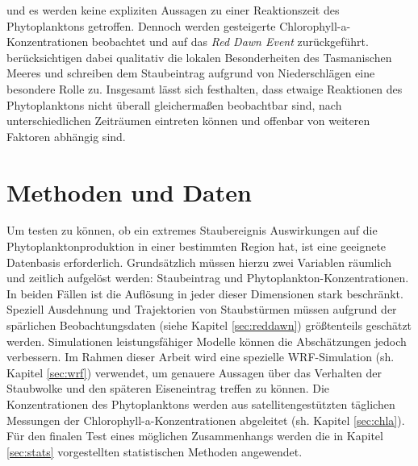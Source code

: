 \documentclass[12pt,a4paper,onecolumn,headheight=30pt]{scrartcl}
\begin{document}
und es werden keine expliziten Aussagen zu einer Reaktionszeit des Phytoplanktons getroffen. Dennoch werden gesteigerte Chlorophyll-a-Konzentrationen beobachtet und auf das \textit{Red Dawn Event} zurückgeführt. \citet{Gabric.2016} berücksichtigen dabei qualitativ die lokalen Besonderheiten des Tasmanischen Meeres und schreiben dem Staubeintrag aufgrund von Niederschlägen eine besondere Rolle zu. Insgesamt lässt sich festhalten, dass etwaige Reaktionen des Phytoplanktons nicht überall gleichermaßen beobachtbar sind, nach unterschiedlichen Zeiträumen eintreten können und offenbar von  weiteren Faktoren abhängig sind. 
\section{Methoden und Daten} \label{sec:Methoden}
Um testen zu können, ob ein extremes Staubereignis Auswirkungen auf die Phytoplanktonproduktion in einer bestimmten Region hat, ist eine geeignete Datenbasis erforderlich. Grundsätzlich müssen hierzu zwei Variablen räumlich und zeitlich aufgelöst werden: Staubeintrag und Phytoplankton-Konzentrationen. In beiden Fällen ist die Auflösung in jeder dieser Dimensionen stark beschränkt. Speziell Ausdehnung und Trajektorien von Staubstürmen müssen aufgrund der spärlichen Beobachtungsdaten (siehe Kapitel  \ref{sec:reddawn}) größtenteils geschätzt werden. Simulationen leistungsfähiger Modelle können die Abschätzungen jedoch verbessern. Im Rahmen dieser Arbeit wird eine spezielle WRF-Simulation (sh. Kapitel \ref{sec:wrf}) verwendet, um genauere Aussagen über das Verhalten der Staubwolke und den späteren Eiseneintrag treffen zu können. Die Konzentrationen des Phytoplanktons werden aus satellitengestützten täglichen Messungen der Chlorophyll-a-Konzentrationen abgeleitet (sh. Kapitel \ref{sec:chla}). Für den finalen Test eines möglichen Zusammenhangs werden die in Kapitel \ref{sec:stats} vorgestellten statistischen Methoden angewendet.
\end{document}
